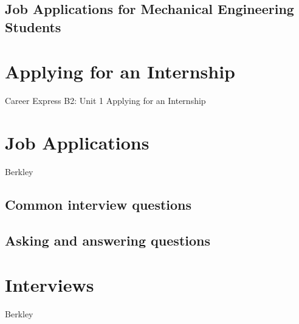 \subsection{Job Applications for Mechanical Engineering Students}



\section{Applying for an Internship}
Career Express B2: Unit 1 Applying for an Internship











\section{Job Applications}
Berkley%
\subsection{Common interview questions}
\subsection{Asking and answering questions}


\section{Interviews}
Berkley%

